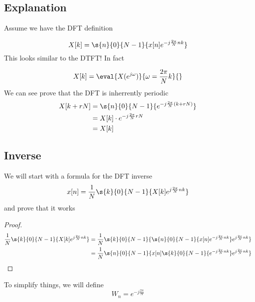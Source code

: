 \documentclass{report}
\begin{document}
\subsection{Explanation}
Assume we have the DFT definition

\begin{equation*}
    X[k] = \s{n}{0}{N-1}{x[n]e^{-j \frac{2 \pi}{N} n k}}
\end{equation*}
This looks similar to the DTFT! In fact

\begin{equation*}
    X[k] = \eval{X(e^{j \omega})}{\omega = \frac{2 \pi}{N} k}{}
\end{equation*}
We can see prove that the DFT is inherrently periodic
\begin{align*}
    X[k + rN] 
    &= \s{n}{0}{N-1}{e^{-j \frac{2 \pi}{N} (k + rN)}} \\
    &= X[k] \cdot e^{-j \frac{2 \pi}{N} rN} \\
    &= X[k]
\end{align*}

\subsection{Inverse}
We will start with a formula for the DFT inverse
\begin{equation*}
    x[n] = \frac{1}{N} \s{k}{0}{N - 1}{X[k] e^{j \frac{2 \pi}{N} nk}}
\end{equation*}
and prove that it works
\begin{proof}
    \begin{align*}
        \frac{1}{N} \s{k}{0}{N - 1}{X[k] e^{j \frac{2 \pi}{N} nk}}
        &= \frac{1}{N} \s{k}{0}{N - 1}{\s{n}{0}{N - 1}{x[n] e^{-j \frac{2 \pi}{N}n k}} e^{j \frac{2 \pi}{N} nk}} \\
        &= \frac{1}{N} \s{n}{0}{N - 1}{x[n] \s{k}{0}{N - 1}{e^{-j \frac{2 \pi}{N}n k}} e^{j \frac{2 \pi}{N} nk}} \\
    \end{align*}
\end{proof}
To simplify things, we will define
\begin{equation*}
    W_n = e^{-j \frac{2\pi}{N}}
\end{equation*}
\end{document}

